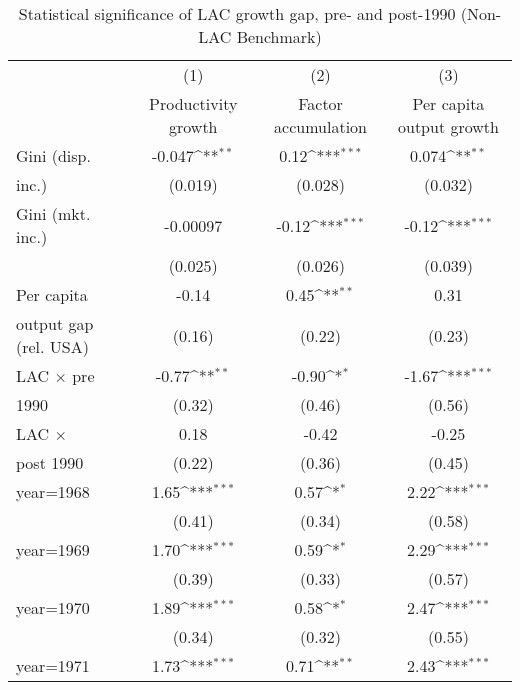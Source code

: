 \begin{sidewaystable}[htbp]\centering
\def\sym#1{\ifmmode^{#1}\else\(^{#1}\)\fi}
\caption{Statistical significance of LAC growth gap, pre- and post-1990 (Non-LAC Benchmark)}
\begin{tabular}{l*{3}{c}}
\toprule
                &\multicolumn{1}{c}{(1)}&\multicolumn{1}{c}{(2)}&\multicolumn{1}{c}{(3)}\\
                &\multicolumn{1}{c}{Productivity growth}&\multicolumn{1}{c}{Factor accumulation}&\multicolumn{1}{c}{Per capita output growth}\\
\midrule
Gini (disp.     &   -0.047\sym{**} &     0.12\sym{***}&    0.074\sym{**} \\
inc.)           &  (0.019)         &  (0.028)         &  (0.032)         \\
\addlinespace
Gini (mkt. inc.)& -0.00097         &    -0.12\sym{***}&    -0.12\sym{***}\\
                &  (0.025)         &  (0.026)         &  (0.039)         \\
\addlinespace
Per capita      &    -0.14         &     0.45\sym{**} &     0.31         \\
output gap (rel. USA)&   (0.16)         &   (0.22)         &   (0.23)         \\
\addlinespace
LAC $\times$ pre&    -0.77\sym{**} &    -0.90\sym{*}  &    -1.67\sym{***}\\
1990            &   (0.32)         &   (0.46)         &   (0.56)         \\
\addlinespace
LAC $\times$    &     0.18         &    -0.42         &    -0.25         \\
post 1990       &   (0.22)         &   (0.36)         &   (0.45)         \\
\addlinespace
year=1968       &     1.65\sym{***}&     0.57\sym{*}  &     2.22\sym{***}\\
                &   (0.41)         &   (0.34)         &   (0.58)         \\
\addlinespace
year=1969       &     1.70\sym{***}&     0.59\sym{*}  &     2.29\sym{***}\\
                &   (0.39)         &   (0.33)         &   (0.57)         \\
\addlinespace
year=1970       &     1.89\sym{***}&     0.58\sym{*}  &     2.47\sym{***}\\
                &   (0.34)         &   (0.32)         &   (0.55)         \\
\addlinespace
year=1971       &     1.73\sym{***}&     0.71\sym{**} &     2.43\sym{***}\\

\end{tabular}
\end{sidewaystable}
